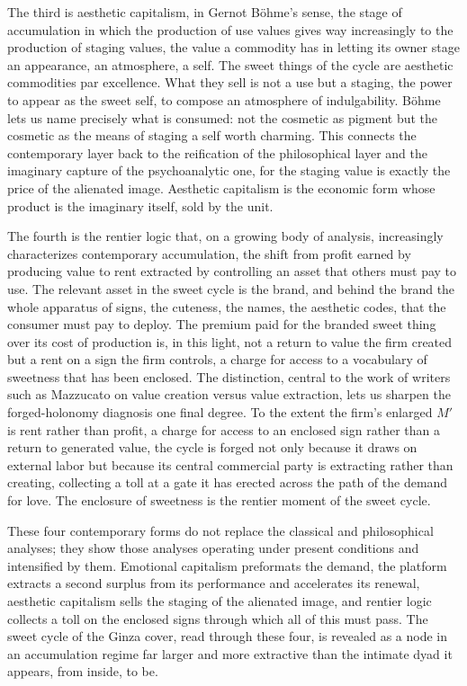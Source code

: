 \documentclass[11pt,a4paper]{article}
\begin{document}
The third is aesthetic capitalism, in Gernot Böhme's sense, the stage of accumulation in which the production of use values gives way increasingly to the production of staging values, the value a commodity has in letting its owner stage an appearance, an atmosphere, a self. The sweet things of the cycle are aesthetic commodities par excellence. What they sell is not a use but a staging, the power to appear as the sweet self, to compose an atmosphere of indulgability. Böhme lets us name precisely what is consumed: not the cosmetic as pigment but the cosmetic as the means of staging a self worth charming. This connects the contemporary layer back to the reification of the philosophical layer and the imaginary capture of the psychoanalytic one, for the staging value is exactly the price of the alienated image. Aesthetic capitalism is the economic form whose product is the imaginary itself, sold by the unit.

The fourth is the rentier logic that, on a growing body of analysis, increasingly characterizes contemporary accumulation, the shift from profit earned by producing value to rent extracted by controlling an asset that others must pay to use. The relevant asset in the sweet cycle is the brand, and behind the brand the whole apparatus of signs, the cuteness, the names, the aesthetic codes, that the consumer must pay to deploy. The premium paid for the branded sweet thing over its cost of production is, in this light, not a return to value the firm created but a rent on a sign the firm controls, a charge for access to a vocabulary of sweetness that has been enclosed. The distinction, central to the work of writers such as Mazzucato on value creation versus value extraction, lets us sharpen the forged-holonomy diagnosis one final degree. To the extent the firm's enlarged $M'$ is rent rather than profit, a charge for access to an enclosed sign rather than a return to generated value, the cycle is forged not only because it draws on external labor but because its central commercial party is extracting rather than creating, collecting a toll at a gate it has erected across the path of the demand for love. The enclosure of sweetness is the rentier moment of the sweet cycle.

These four contemporary forms do not replace the classical and philosophical analyses; they show those analyses operating under present conditions and intensified by them. Emotional capitalism preformats the demand, the platform extracts a second surplus from its performance and accelerates its renewal, aesthetic capitalism sells the staging of the alienated image, and rentier logic collects a toll on the enclosed signs through which all of this must pass. The sweet cycle of the Ginza cover, read through these four, is revealed as a node in an accumulation regime far larger and more extractive than the intimate dyad it appears, from inside, to be.
\end{document}
